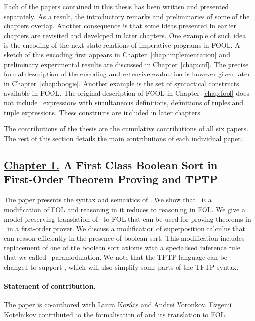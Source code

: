 Each of the papers contained in this thesis has been written and presented separately. As a result, the introductory remarks and preliminaries of some of the chapters overlap. Another consequence is that some ideas presented in earlier chapters are revisited and developed in later chapters. One example of such idea is the encoding of the next state relations of imperative programs in FOOL. A sketch of this encoding first appears in Chapter~\ref{chap:implementation} and preliminary experimental results are discussed in Chapter~\ref{chap:cnf}. The precise formal description of the encoding and extensive evaluation is however given later in Chapter~\ref{chap:boogie}. Another example is the set of syntactical constructs available in FOOL. The original description of FOOL in Chapter~\ref{chap:fool} does not include \LETIN\ expressions with simultaneous definitions, definitions of tuples and tuple expressions. These constructs are included in later chapters.

The contributions of the thesis are the cumulative contributions of all six papers. The rest of this section details the main contributions of each individual paper.

\subsection*{\hyperref[chap:fool]{Chapter 1.} A First Class Boolean Sort in\\First-Order Theorem Proving and TPTP}
The paper presents the syntax and semantics of \folb. We show that \folb\ is a modification of FOL and reasoning in it reduces to reasoning in FOL. We give a model-preserving \iffalse(modulo introduced definitions)\fi translation of \folb\ to FOL that can be used for proving theorems in \folb\ in a first-order prover. We discuss a modification of superposition calculus that can reason efficiently in the presence of boolean sort. This modification includes replacement of one of the boolean sort axioms with a specialised inference rule that we called \folb\ paramodulation. We note that the TPTP language can be changed to support \folb, which will also simplify some parts of the TPTP syntax. 

\paragraph{Statement of contribution.} The paper is co-authored with Laura Kov\'{a}cs and Andrei Voronkov. Evgenii Kotelnikov contributed to the formalisation of \folb{} and its translation to FOL.

